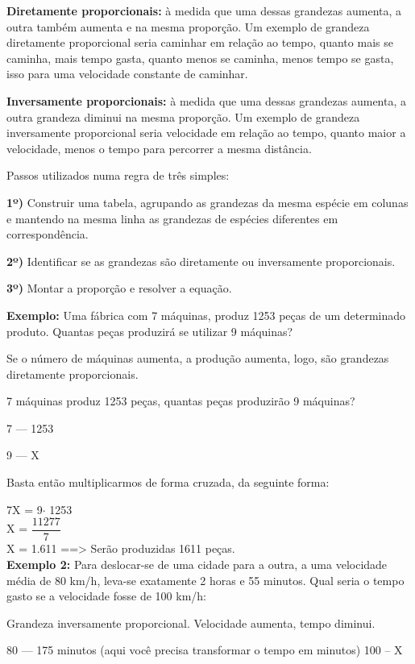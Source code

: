 \begin{multicols*}{2}
	\textbf{Diretamente proporcionais:} à medida que uma dessas grandezas aumenta, a outra também aumenta e na mesma proporção. Um exemplo de grandeza diretamente proporcional seria caminhar em relação ao tempo, quanto mais se caminha, mais tempo gasta, quanto menos se caminha, menos tempo se gasta, isso para uma velocidade constante de caminhar.
	
	\textbf{Inversamente proporcionais:} à medida que uma dessas grandezas aumenta, a outra grandeza diminui na mesma proporção. Um exemplo de grandeza inversamente proporcional seria velocidade em relação ao tempo, quanto maior a velocidade, menos o tempo para percorrer a mesma distância.
	
	Passos utilizados numa regra de três simples:
	
\textbf{1º)} Construir uma tabela, agrupando as grandezas da mesma espécie em colunas e mantendo na mesma linha as grandezas de espécies diferentes em correspondência.

\textbf{2º)} Identificar se as grandezas são diretamente ou inversamente proporcionais.

\textbf{3º)} Montar a proporção e resolver a equação.
	
	\textbf{Exemplo:} Uma fábrica com 7 máquinas, produz 1253 peças de um determinado produto. Quantas peças produzirá se utilizar 9 máquinas?
	
	Se o número de máquinas aumenta, a produção aumenta, logo, são grandezas diretamente proporcionais.
	
	7 máquinas produz 1253 peças, quantas peças produzirão 9 máquinas?
	
	7  ---   1253
	
	9  ---      X
	
	Basta então multiplicarmos de forma cruzada, da seguinte forma:
	
	7X = 9$\cdot$ 1253  \\
	
	X = $\dfrac{11277}{7}$\\
	
	X = 1.611  ==> Serão produzidas 1611 peças.\\
	
	\textbf{Exemplo 2:} Para deslocar-se de uma cidade para a outra, a uma velocidade média de 80 km/h, leva-se exatamente 2 horas e 55 minutos. Qual seria o tempo gasto se a velocidade fosse de 100 km/h:
	
	Grandeza inversamente proporcional. Velocidade aumenta, tempo diminui.
	
	80  ---  175 minutos (aqui você precisa transformar o tempo em minutos)
	100 --    X  
	

\end{multicols*}
